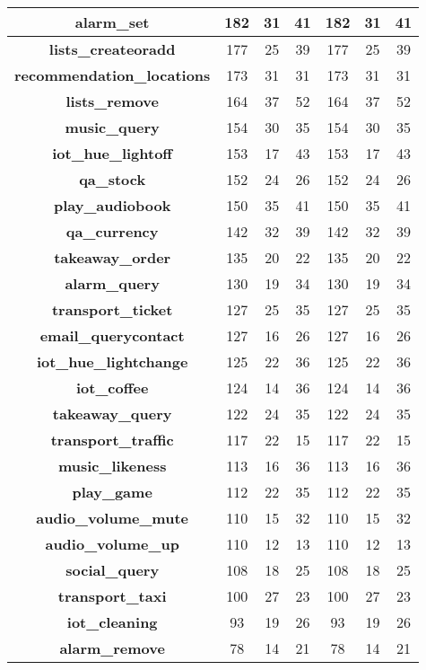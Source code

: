 \begin{table}[]
{\begin{tabular}{|c||c|c|c|c|c|c|}
  \textbf{alarm\_set}& 182 & 31 & 41 & 182 & 31 & 41\\ \hline
  \textbf{lists\_createoradd}& 177 & 25 & 39 & 177 & 25 & 39\\ \hline
  \textbf{recommendation\_locations}& 173 & 31 & 31 & 173 & 31 & 31\\ \hline
  \textbf{lists\_remove}& 164 & 37 & 52 & 164 & 37 & 52\\ \hline
  \textbf{music\_query}& 154 & 30 & 35 & 154 & 30 & 35\\ \hline
  \textbf{iot\_hue\_lightoff}& 153 & 17 & 43 & 153 & 17 & 43\\ \hline
  \textbf{qa\_stock}& 152 & 24 & 26 & 152 & 24 & 26\\ \hline
  \textbf{play\_audiobook}& 150 & 35 & 41 & 150 & 35 & 41\\ \hline
  \textbf{qa\_currency}& 142 & 32 & 39 & 142 & 32 & 39\\ \hline
  \textbf{takeaway\_order}& 135 & 20 & 22 & 135 & 20 & 22\\ \hline
  \textbf{alarm\_query}& 130 & 19 & 34 & 130 & 19 & 34\\ \hline
  \textbf{transport\_ticket}& 127 & 25 & 35 & 127 & 25 & 35\\ \hline
  \textbf{email\_querycontact}& 127 & 16 & 26 & 127 & 16 & 26\\ \hline
  \textbf{iot\_hue\_lightchange}& 125 & 22 & 36 & 125 & 22 & 36\\ \hline
  \textbf{iot\_coffee}& 124 & 14 & 36 & 124 & 14 & 36\\ \hline
  \textbf{takeaway\_query}& 122 & 24 & 35 & 122 & 24 & 35\\ \hline
  \textbf{transport\_traffic}& 117 & 22 & 15 & 117 & 22 & 15\\ \hline
  \textbf{music\_likeness}& 113 & 16 & 36 & 113 & 16 & 36\\ \hline
  \textbf{play\_game}& 112 & 22 & 35 & 112 & 22 & 35\\ \hline
  \textbf{audio\_volume\_mute}& 110 & 15 & 32 & 110 & 15 & 32\\ \hline
  \textbf{audio\_volume\_up}& 110 & 12 & 13 & 110 & 12 & 13\\ \hline
  \textbf{social\_query}& 108 & 18 & 25 & 108 & 18 & 25\\ \hline
  \textbf{transport\_taxi}& 100 & 27 & 23 & 100 & 27 & 23\\ \hline
  \textbf{iot\_cleaning}& 93 & 19 & 26 & 93 & 19 & 26\\ \hline
  \textbf{alarm\_remove}& 78 & 14 & 21 & 78 & 14 & 21\\ \hline

\end{tabular}}
\end{table}
